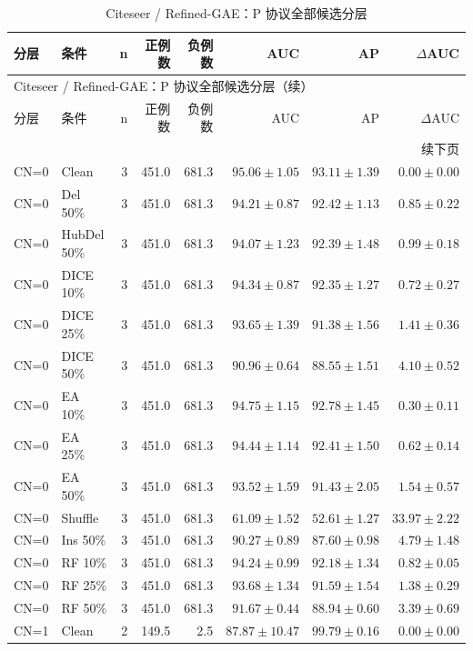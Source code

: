 {\footnotesize
\setlength{\tabcolsep}{3.2pt}
\renewcommand{\arraystretch}{1.10}
\begin{longtable}{llrrrrrr}
\caption{Citeseer / Refined-GAE：P 协议全部候选分层}\\
\toprule
分层 & 条件 & n & 正例数 & 负例数 & AUC & AP & $\Delta$AUC \\
\midrule
\endfirsthead
\multicolumn{8}{l}{Citeseer / Refined-GAE：P 协议全部候选分层（续）}\\
\toprule
分层 & 条件 & n & 正例数 & 负例数 & AUC & AP & $\Delta$AUC \\
\midrule
\endhead
\midrule\multicolumn{8}{r}{续下页}\\
\endfoot
\bottomrule
\endlastfoot
CN=0 & Clean & 3 & 451.0 & 681.3 & $95.06\pm1.05$ & $93.11\pm1.39$ & $0.00\pm0.00$ \\
CN=0 & Del 50\% & 3 & 451.0 & 681.3 & $94.21\pm0.87$ & $92.42\pm1.13$ & $0.85\pm0.22$ \\
CN=0 & HubDel 50\% & 3 & 451.0 & 681.3 & $94.07\pm1.23$ & $92.39\pm1.48$ & $0.99\pm0.18$ \\
CN=0 & DICE 10\% & 3 & 451.0 & 681.3 & $94.34\pm0.87$ & $92.35\pm1.27$ & $0.72\pm0.27$ \\
CN=0 & DICE 25\% & 3 & 451.0 & 681.3 & $93.65\pm1.39$ & $91.38\pm1.56$ & $1.41\pm0.36$ \\
CN=0 & DICE 50\% & 3 & 451.0 & 681.3 & $90.96\pm0.64$ & $88.55\pm1.51$ & $4.10\pm0.52$ \\
CN=0 & EA 10\% & 3 & 451.0 & 681.3 & $94.75\pm1.15$ & $92.78\pm1.45$ & $0.30\pm0.11$ \\
CN=0 & EA 25\% & 3 & 451.0 & 681.3 & $94.44\pm1.14$ & $92.41\pm1.50$ & $0.62\pm0.14$ \\
CN=0 & EA 50\% & 3 & 451.0 & 681.3 & $93.52\pm1.59$ & $91.43\pm2.05$ & $1.54\pm0.57$ \\
CN=0 & Shuffle & 3 & 451.0 & 681.3 & $61.09\pm1.52$ & $52.61\pm1.27$ & $33.97\pm2.22$ \\
CN=0 & Ins 50\% & 3 & 451.0 & 681.3 & $90.27\pm0.89$ & $87.60\pm0.98$ & $4.79\pm1.48$ \\
CN=0 & RF 10\% & 3 & 451.0 & 681.3 & $94.24\pm0.99$ & $92.18\pm1.34$ & $0.82\pm0.05$ \\
CN=0 & RF 25\% & 3 & 451.0 & 681.3 & $93.68\pm1.34$ & $91.59\pm1.54$ & $1.38\pm0.29$ \\
CN=0 & RF 50\% & 3 & 451.0 & 681.3 & $91.67\pm0.44$ & $88.94\pm0.60$ & $3.39\pm0.69$ \\
CN=1 & Clean & 2 & 149.5 & 2.5 & $87.87\pm10.47$ & $99.79\pm0.16$ & $0.00\pm0.00$ \\

\end{longtable}}
